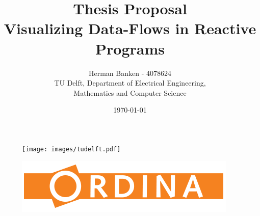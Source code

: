 \documentclass[11pt,a4paper]{article}
\begin{document}
\title{ Thesis Proposal \\
Visualizing Data-Flows in Reactive Programs }
\author{ Herman Banken - 4078624
\vspace{1cm} \\
TU Delft, Department of Electrical Engineering, \\
Mathematics and Computer Science }
\date{\today}

\vfill

\begin{figure}[!bp]
    \centering
    \begin{minipage}[b]
        {0.4\textwidth} \texttt{[image: images/tudelft.pdf]}
    \end{minipage}
    \hfill
    \begin{minipage}[b]
        {0.4\textwidth} \includegraphics[width=\textwidth]{images/ordina.png}
    \end{minipage}
\end{figure}

\maketitle

\clearpage
\end{document}
